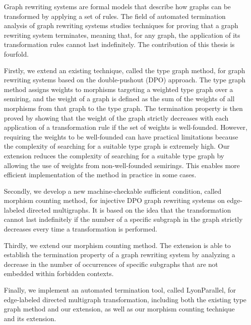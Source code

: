 Graph rewriting systems are formal models that describe how graphs can be transformed by applying a set of rules. The field of automated termination analysis of graph rewriting systems studies techniques for proving that a graph rewriting system terminates, meaning that, for any graph, the application of its transformation rules cannot last indefinitely. The contribution of this thesis is fourfold.

Firstly, we extend an existing technique, called the type graph method, for graph rewriting systems based on the double-pushout (DPO) approach. The type graph method assigns weights to morphisms targeting a weighted type graph over a semiring, and the weight of a graph is defined as the sum of the weights of all morphisms from that graph to the type graph. The termination property is then proved by showing that the weight of the graph strictly decreases with each application of a transformation rule if the set of weights is well-founded. However, requiring the weights to be well-founded can have practical limitations because the complexity of searching for a suitable type graph is extremely high.
Our extension reduces the complexity of searching for a suitable type graph by allowing the use of weights from non-well-founded semirings. This enables more efficient implementation of the method in practice in some cases.

Secondly, we develop a new machine-checkable sufficient condition, called morphism counting method, for injective DPO graph rewriting systems on edge-labeled directed multigraphs. It is based on the idea that the transformation cannot last indefinitely if the number of a specific subgraph in the graph strictly decreases every time a transformation is performed.

Thirdly, we extend our morphism counting method. The extension is able to establish the termination property of a graph rewriting system by analyzing a decrease in the number of occurrences of specific subgraphs that are not embedded within forbidden contexts. 

Finally, we implement an automated termination tool, called LyonParallel, for edge-labeled directed multigraph transformation, including both the existing
type graph method and our extension, as well as our morphism counting technique and its extension. 

 





